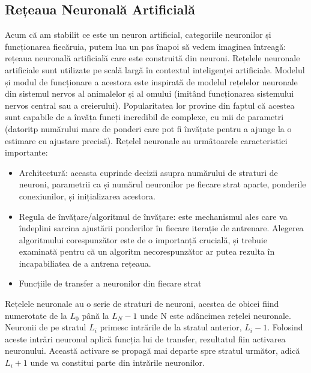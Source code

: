 \subsection{Rețeaua Neuronală Artificială}
Acum că am stabilit ce este un neuron artificial, categoriile neuronilor și funcționarea fiecăruia, putem lua un pas înapoi să vedem imaginea întreagă: rețeaua neuronală artificială care este construită din neuroni.\newline
Rețelele neuronale artificiale sunt utilizate pe scală largă în contextul inteligenței artificiale. Modelul și modul de funcționare a acestora este inspirată de modelul rețelelor neuronale din sistemul nervos al animalelor și al omului (imitând funcționarea sistemului nervos central sau a creierului).\newline
Popularitatea lor provine din faptul că acestea sunt capabile de a învăța funcți incredibil de complexe, cu mii de parametri (datoritp numărului mare de ponderi care pot fi învățate pentru a ajunge la o estimare cu ajustare precisă). Rețelel neuronale au urmâtoarele caracteristici importante:
\begin{itemize}
	\item Architectură: aceasta cuprinde decizii asupra numărului de straturi de neuroni, parametrii ca și numărul neuronilor pe fiecare strat aparte, ponderile conexiunilor, și inițializarea acestora.
	\item Regula de învățare/algoritmul de învățare: este mechanismul ales care va îndeplini sarcina ajustării ponderilor în fiecare iterație de antrenare. Alegerea algoritmului corespunzător este de o importanță crucială, și trebuie examinată pentru că un algoritm necorespunzător ar putea rezulta în incapabiliatea de a antrena rețeaua.
	\item Funcțiile de transfer a neuronilor din fiecare strat
\end{itemize}
Rețelele neuronale au o serie de straturi de neuroni, acestea de obicei fiind numerotate de la $L_0$ până la $L_N-1$ unde N este adâncimea rețelei neuronale. Neuronii de pe stratul $L_i$ primesc intrările de la stratul anterior, $L_i-1$. Folosind aceste intrări neuronul aplică funcția lui de transfer, rezultatul fiin activarea neuronului. Această activare se propagă mai departe spre stratul următor, adică $L_i+1$ unde va constitui parte din intrările neuronilor.

